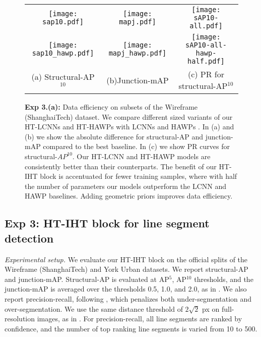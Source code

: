 \documentclass[runningheads]{llncs}
\newcommand{\model}{HT-IHT block\xspace}
\begin{document}
\begin{figure}[t!]
    \centering
    \begin{tabular}{ccc}
        \texttt{[image: sap10.pdf]} &
        \texttt{[image: mapj.pdf]} &
        \texttt{[image: sAP10-all.pdf]} \\
        
        \texttt{[image: sap10\_hawp.pdf]} &
        \texttt{[image: mapj\_hawp.pdf]} &
        \texttt{[image: sAP10-all-hawp-half.pdf]} \\
        (a) Structural-AP$^{10}$ & (b)Junction-mAP & (c) PR for structural-AP$^{10}$\\
    \end{tabular}
    \caption{\textbf{Exp 3.(a):} Data efficiency on subsets of the Wireframe (ShanghaiTech) dataset.
    We compare different sized variants of our HT-LCNNs and HT-HAWPs with LCNNs \cite{zhou2019end} and HAWPs \cite{xue2020holistically}. 
    In (a) and (b) we show the absolute difference for structural-AP and junction-mAP compared to the best baseline. 
    In (c) we show PR curves for structural-$AP^{10}$.
    Our HT-LCNN and HT-HAWP models are consistently better than their counterparts. 
    The benefit of our \model is accentuated for fewer training samples, where with half the number of parameters our models outperform the LCNN and HAWP baselines.
    Adding geometric priors improves data efficiency.}
    \label{fig:exp3_a}
\end{figure}


\subsection{\textbf{Exp 3:} \model for line segment detection}
\noindent\emph{Experimental setup.} 
We evaluate our \model on the official splits of the Wireframe (ShanghaiTech) \cite{huang2018learning} and York Urban \cite{denis2008efficient} datasets. 
We report structural-AP and junction-mAP. 
Structural-AP is evaluated at AP$^{5}$, AP$^{10}$ thresholds, and the junction-mAP is averaged over the thresholds 0.5, 1.0, and 2.0, as in \cite{zhou2019learning}.
We also report precision-recall, following \cite{almazan2017mcmlsd}, which penalizes both under-segmentation and over-segmentation. 
We use the same distance threshold of $2\sqrt{2}$ px on full-resolution images, as in \cite{almazan2017mcmlsd}. 
For precision-recall, all line segments are ranked by confidence, and the number of top ranking line segments is varied from 10 to 500. 
\end{document}
